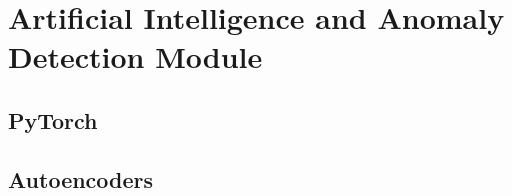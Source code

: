 \section{Artificial Intelligence and Anomaly Detection Module}
\label{sec:ai_anomaly_detection}

\subsection{PyTorch}
\label{subsec:pytorch}

\subsection{Autoencoders}
\label{subsec:autoencoders}

